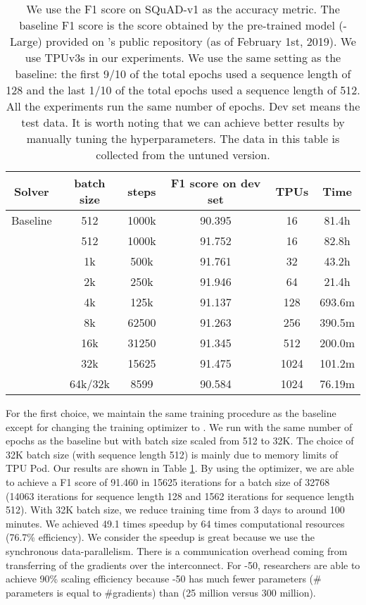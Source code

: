 \documentclass{article} \usepackage{iclr2020_conference,times}
\begin{document}
\begin{table}[ht]
\renewcommand{\arraystretch}{1.3}
\caption{ We use the F1 score on SQuAD-v1 as the accuracy metric. The baseline F1 score is the score obtained by the pre-trained model (-Large) provided on 's public repository (as of February 1st, 2019). We use TPUv3s in our experiments. We use the same setting as the baseline: the first 9/10 of the total epochs used a sequence length of 128 and the last 1/10 of the total epochs used a sequence length of 512. All the experiments run the same number of epochs. Dev set means the test data. It is worth noting that we can achieve better results by manually tuning the hyperparameters. The data in this table is collected from the untuned version.}
\centering
 
\begin{tabular}{|c|c|c|c|c|c|}
\hline
Solver & batch size & steps & F1 score on dev set & TPUs & Time\\
\hline
\hline
Baseline & 512 & 1000k & 90.395 & 16 & 81.4h\\
\hline
 & 512 & 1000k & 91.752 & 16 & 82.8h\\
\hline
 & 1k & 500k & 91.761 & 32 & 43.2h\\
\hline
 & 2k & 250k & 91.946 & 64 & 21.4h\\
\hline
 & 4k & 125k & 91.137 & 128 & 693.6m\\
\hline
 & 8k & 62500 & 91.263 & 256 & 390.5m\\
\hline
 & 16k & 31250 & 91.345 & 512 & 200.0m\\
\hline
 & 32k & 15625 & 91.475 & 1024 & 101.2m\\
\hline
\hline
 & 64k/32k & 8599 & 90.584 & 1024 & 76.19m\\
\hline
\end{tabular}
\label{table:results}
\end{table}










For the first choice, we maintain the same training procedure as the baseline except for changing the training optimizer to . We run with the same number of epochs as the baseline but with batch size scaled from 512 to 32K. The choice of 32K batch size (with sequence length 512) is mainly due to memory limits of TPU Pod. Our results are shown in Table \ref{table:results}. By using the  optimizer, we are able to achieve a F1 score of 91.460 in 15625 iterations for a batch size of 32768 (14063 iterations for sequence length 128 and 1562 iterations for sequence length 512).
With 32K batch size, we reduce  training time from 3 days to around 100 minutes. 
We achieved 49.1 times speedup by 64 times computational resources (76.7\% efficiency).
We consider the speedup is great because we use the synchronous data-parallelism. 
There is a communication overhead coming from transferring of the gradients over the interconnect.
For -50, researchers are able to achieve 90\% scaling efficiency because -50 has much fewer parameters (\# parameters is equal to \#gradients) than  (25 million versus 300 million).
\end{document}
